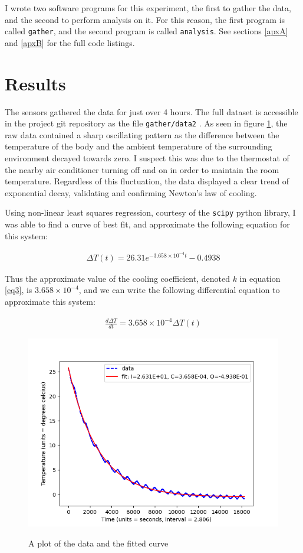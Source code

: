 \documentclass[12pt]{article}
\begin{document}
I wrote two software programs for this experiment,
the first to gather the data,
and the second to perform analysis on it.
For this reason, the first program
is called \texttt{gather},
and the second program is called \texttt{analysis}.
See sections \ref{apxA} and \ref{apxB} for the full code listings.


\section{Results}

The sensors gathered the data
for just over 4 hours.
The full dataset is accessible
in the project git repository
as the file \texttt{gather/data2} \cite{project_repo}.
As seen in figure \ref{fig1},
the raw data contained
a sharp oscillating pattern
as the difference between
the temperature of the body
and the ambient temperature
of the surrounding environment
decayed towards zero.
I suspect this was due
to the thermostat of the nearby air conditioner
turning off and on in order to maintain the room temperature.
Regardless of this fluctuation,
the data displayed a clear trend
of exponential decay,
validating and confirming
Newton's law of cooling.

Using non-linear least squares regression,
courtesy of the \texttt{scipy} python library,
I was able to find a curve of best fit,
and approximate the following equation for this system:

\begin{align}
	\Delta T(t) = 26.31e^{-3.658 \times 10^{-4} t} - 0.4938
\end{align}

Thus the approximate value of the cooling coefficient,
denoted $k$ in equation \ref{eq3},
is $3.658 \times 10^{-4}$,
and we can write the following differential equation
to approximate this system:

\begin{align}
	\frac{d\Delta T}{dt} = 3.658 \times 10^{-4}\Delta T(t)
\end{align}

\begin{figure}
	\includegraphics[scale=0.8]{Figure_1.png}
	\centering
	\label{fig1}
	\caption{A plot of the data and the fitted curve}
\end{figure}
\end{document}

